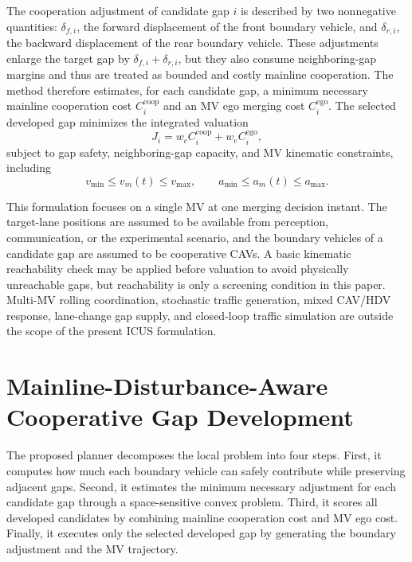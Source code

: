 \documentclass[conference]{IEEEtran}
\begin{document}
The cooperation adjustment of candidate gap \(i\) is described by two
nonnegative quantities: \(\delta_{f,i}\), the forward displacement of the
front boundary vehicle, and \(\delta_{r,i}\), the backward displacement of the
rear boundary vehicle. These adjustments enlarge the target gap by
\(\delta_{f,i}+\delta_{r,i}\), but they also consume neighboring-gap margins
and thus are treated as bounded and costly mainline cooperation. The method
therefore estimates, for each candidate gap, a minimum necessary mainline
cooperation cost \(C_i^{\mathrm{coop}}\) and an MV ego merging cost
\(C_i^{\mathrm{ego}}\). The selected developed gap minimizes the integrated
valuation
\begin{equation}
    J_i=w_c C_i^{\mathrm{coop}}+w_e C_i^{\mathrm{ego}},
    \label{eq:abstract_score}
\end{equation}
subject to gap safety, neighboring-gap capacity, and MV kinematic constraints,
including
\begin{equation}
    v_{\min}\leq v_m(t)\leq v_{\max},\qquad
    a_{\min}\leq a_m(t)\leq a_{\max}.
\end{equation}

This formulation focuses on a single MV at one merging decision instant. The
target-lane positions are assumed to be available from perception,
communication, or the experimental scenario, and the boundary vehicles of a
candidate gap are assumed to be cooperative CAVs. A basic kinematic reachability
check may be applied before valuation to avoid physically unreachable gaps, but
reachability is only a screening condition in this paper. Multi-MV rolling
coordination, stochastic traffic generation, mixed CAV/HDV response, lane-change
gap supply, and closed-loop traffic simulation are outside the scope of the
present ICUS formulation.

\section{Mainline-Disturbance-Aware Cooperative Gap Development}
The proposed planner decomposes the local problem into four steps. First, it
computes how much each boundary vehicle can safely contribute while preserving
adjacent gaps. Second, it estimates the minimum necessary adjustment for each
candidate gap through a space-sensitive convex problem. Third, it scores all
developed candidates by combining mainline cooperation cost and MV ego cost.
Finally, it executes only the selected developed gap by generating the boundary
adjustment and the MV trajectory.
\end{document}
